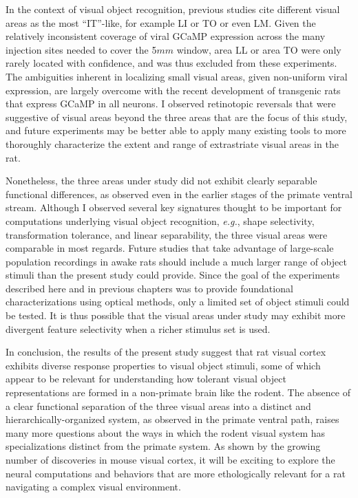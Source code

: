 In the context of visual object recognition, previous studies cite different visual areas as the most ``IT''-like, for example LI\cite{Tafazoli2017, Matteucci2019b} or TO\cite{Vermaercke2015, Vermaercke2014} or even LM\cite{Froudarakis2020}. Given the relatively inconsistent coverage of viral GCaMP expression across the many injection sites needed to cover the 5$mm$ window, area LL or area TO were only rarely located with confidence, and was thus excluded from these experiments. The ambiguities inherent in localizing small visual areas, given non-uniform viral expression, are largely overcome with the recent development of transgenic rats that express GCaMP in all neurons\cite{Scott2018}. I observed retinotopic reversals that were suggestive of visual areas beyond the three areas that are the focus of this study, and future experiments may be better able to apply many existing tools to more thoroughly characterize the extent and range of extrastriate visual areas in the rat. 

Nonetheless, the three areas under study did not exhibit clearly separable functional differences, as observed even in the earlier stages of the primate ventral stream. Although I observed several key signatures thought to be important for computations underlying visual object recognition, \textit{e.g.}, shape selectivity, transformation tolerance, and linear separability, the three visual areas were comparable in most regards. Future studies that take advantage of large-scale population recordings in awake rats should include a much larger range of object stimuli than the present study could provide. Since the goal of the experiments described here and in previous chapters was to provide foundational characterizations using optical methods, only a limited set of object stimuli could be tested. It is thus possible that the visual areas under study may exhibit more divergent feature selectivity when a richer stimulus set is used. 

In conclusion, the results of the present study suggest that rat visual cortex exhibits diverse response properties to visual object stimuli, some of which appear to be relevant for understanding how tolerant visual object representations are formed in a non-primate brain like the rodent. The absence of a clear functional separation of the three visual areas into a distinct and hierarchically-organized system, as observed in the primate ventral path, raises many more questions about the ways in which the rodent visual system has specializations distinct from the primate system. As shown by the growing number of discoveries in mouse visual cortex, it will be exciting to explore the neural computations and behaviors that are more ethologically relevant for a rat navigating a complex visual environment. 
